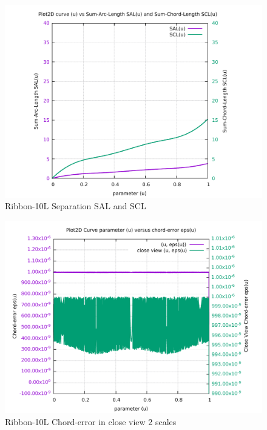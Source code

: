 \begin{figure}
	\caption     {Ribbon-10L Separation SAL and SCL}
	\label{08-img-Ribbon-10L-Separation-SAL-and-SCL.pdf}
	\includegraphics[width=1.00\textwidth]{Chap4/appendix/app-Ribbon-10L/plots/08-img-Ribbon-10L-Separation-SAL-and-SCL.pdf}
\end{figure}

\clearpage
\pagebreak

\begin{figure}
	\caption     {Ribbon-10L Chord-error in close view 2 scales}
	\label{09-img-Ribbon-10L-Chord-error-in-close-view-2-scales.pdf}
	\includegraphics[width=1.00\textwidth]{Chap4/appendix/app-Ribbon-10L/plots/09-img-Ribbon-10L-Chord-error-in-close-view-2-scales.pdf}
\end{figure}

